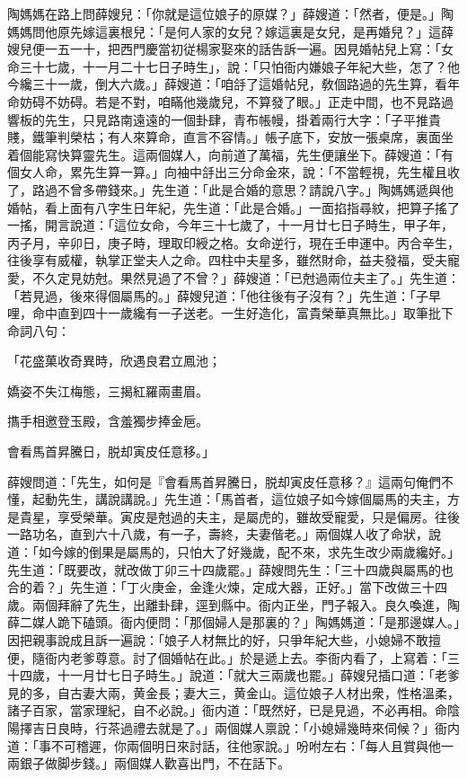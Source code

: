 陶媽媽在路上問薛嫂兒：「你就是這位娘子的原媒？」薛嫂道：「然者，便是。」陶媽媽問他原先嫁這裏根兒：「是何人家的女兒？嫁這裏是女兒，是再婚兒？」這薛嫂兒便一五一十，把西門慶當初従楊家娶來的話告訴一遍。因見婚帖兒上寫：「女命三十七歲，十一月二十七日子時生」，說：「只怕衙内嫌娘子年紀大些，怎了？他今纔三十一歲，倒大六歲。」薛嫂道：「咱㧱了這婚帖兒，敎個路過的先生算，看年命妨碍不妨碍。若是不對，咱瞞他幾歲兒，不算發了眼。」正走中間，也不見路過響板的先生，只見路南遠遠的一個卦肆，青布帳幔，掛着兩行大字：「子平推貴賤，鐵筆判榮枯；有人來算命，直言不容情。」帳子底下，安放一張桌席，裏面坐着個能寫快算靈先生。這兩個媒人，向前道了萬福，先生便讓坐下。薛嫂道：「有個女人命，累先生算一算。」向袖中㧱出三分命金來，說：「不當輕視，先生權且收了，路過不曾多帶錢來。」先生道：「此是合婚的意思？請說八字。」陶媽媽遞與他婚帖，看上面有八字生日年紀，先生道：「此是合婚。」一面掐指尋紋，把算子搖了一搖，開言說道：「這位女命，今年三十七歲了，十一月廿七日子時生，甲子年，丙子月，辛卯日，庚子時，理取印綬之格。女命逆行，現在壬申運中。丙合辛生，往後享有威權，執掌正堂夫人之命。四柱中夫星多，雖然財命，益夫發福，受夫寵愛，不久定見妨尅。果然見過了不曾？」薛嫂道：「已尅過兩位夫主了。」先生道：「若見過，後來得個屬馬的。」薛嫂兒道：「他往後有子沒有？」先生道：「子早哩，命中直到四十一歲纔有一子送老。一生好造化，富貴榮華真無比。」取筆批下命詞八句：

「花盛菓收奇異時，欣遇良君立鳳池；

嬌姿不失江梅態，三揭紅羅兩畫眉。

㩦手相邀登玉殿，含羞獨步捧金巵。

會看馬首昇騰日，脱却寅皮任意移。」

薛嫂問道：「先生，如何是『會看馬首昇騰日，脱却寅皮任意移？』這兩句俺們不懂，起動先生，講說講說。」先生道：「馬首者，這位娘子如今嫁個屬馬的夫主，方是貴星，享受榮華。寅皮是尅過的夫主，是屬虎的，雖故受寵愛，只是偏房。往後一路功名，直到六十八歲，有一子，壽終，夫妻偕老。」兩個媒人收了命狀，說道：「如今嫁的倒果是屬馬的，只怕大了好幾歲，配不來，求先生改少兩歲纔好。」先生道：「既要改，就改做丁卯三十四歲罷。」薛嫂問先生：「三十四歲與屬馬的也合的着？」先生道：「丁火庚金，金逢火煉，定成大器，正好。」當下改做三十四歲。兩個拜辭了先生，出離卦肆，逕到縣中。衙内正坐，門子報入。良久喚進，陶薛二媒人跪下磕頭。衙内便問：「那個婦人是那裏的？」陶媽媽道：「是那邊媒人。」因把親事說成且訴一遍說：「娘子人材無比的好，只爭年紀大些，小媳婦不敢擅便，隨衙内老爹尊意。討了個婚帖在此。」於是遞上去。李衙内看了，上寫着：「三十四歲，十一月廿七日子時生。」說道：「就大三兩歲也罷。」薛嫂兒插口道：「老爹見的多，自古妻大兩，黄金長；妻大三，黄金山。這位娘子人材出衆，性格溫柔，諸子百家，當家理紀，自不必說。」衙内道：「既然好，已是見過，不必再相。命陰陽擇吉日良時，行茶過禮去就是了。」兩個媒人禀說：「小媳婦幾時來伺候？」衙内道：「事不可稽遲，你兩個明日來討話，往他家說。」吩咐左右：「每人且賞與他一兩銀子做脚步錢。」兩個媒人歡喜出門，不在話下。


